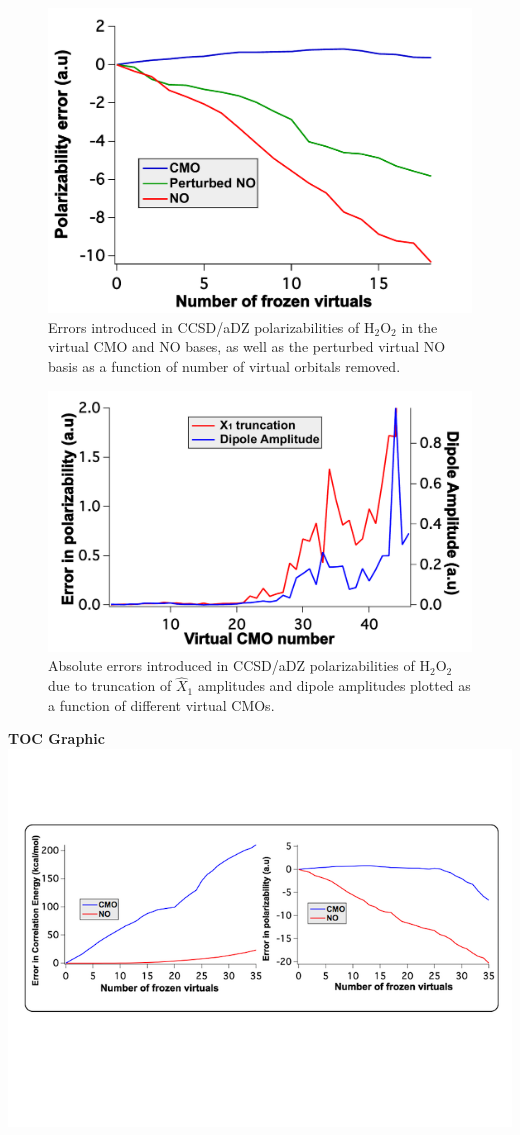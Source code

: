 \begin{figure}
  \centering
  \includegraphics[width=0.6\linewidth]{figures/perturbed.pdf}
  \caption{Errors introduced in CCSD/aDZ polarizabilities of
H$_2$O$_2$ in the virtual CMO and NO bases, as well as the perturbed
virtual NO basis as a function of number of virtual orbitals removed.}
   \label{fig:perturb}
\end{figure}
\begin{figure}
  \centering
  \includegraphics[width=0.6\linewidth]{figures/diplength.pdf}
  \caption{Absolute errors introduced in CCSD/aDZ
  polarizabilities of H$_2$O$_2$ due to truncation of $\hat{X}_1$ amplitudes and
  dipole amplitudes plotted as a function of different virtual CMOs.}
   \label{fig:dipole_length}
\end{figure}


\newpage
\begin{center}
{\bf TOC Graphic}
\includegraphics[width=1.0\linewidth]{figures/toc.png}
\end{center}
